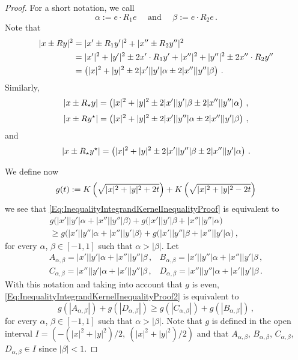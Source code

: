 \begin{proof}
    
	For a short notation, we call
	$$
	\alpha := e \cdot R_1 e  \quad \text{ and } \quad \beta := e \cdot R_2 e\,.
	$$
	Note that 
	\begin{align*}
	|x \pm Ry|^2&= |x' \pm R_1y'|^2 + |x'' \pm R_2y''|^2 \\
	&= |x'|^2 + |y'|^2 \pm 2 x'\cdot R_1 y' +  |x''|^2 + |y''|^2 \pm 2 x''\cdot R_2 y''\\
	&= \left ( { |x|^2 + |y|^2 \pm 2 |x'||y'| \alpha \pm 2 |x''||y''| \beta}\right )\,.
	\end{align*}
    Similarly,
    $$
    |x \pm R_\star y| = \left ( { |x|^2 + |y|^2 \pm 2 |x'||y'| \beta \pm 2 |x''||y''|\alpha}\right )\,,
    $$
    $$
    |x \pm R y^\star| = \left ( { |x|^2 + |y|^2 \pm 2 |x'||y''| \alpha \pm 2 |x''||y'|\beta}\right )\,,
    $$
    and
    $$
    |x \pm R_\star y^\star| = \left ( { |x|^2 + |y|^2 \pm 2 |x'||y''| \beta \pm 2 |x''||y'| \alpha}\right )\,.
    $$
	
	We define now
	$$
	g(t) := K \left ( {\sqrt{|x|^2 + |y|^2 + 2 t}}\right ) + K \left ( {\sqrt{|x|^2 + |y|^2 - 2 t}}\right )
	$$
	we see that \eqref{Eq:InequalityIntegrandKernelInequalityProof} is equivalent to
	\begin{equation}
	\label{Eq:InequalityIntegrandKernelInequalityProof2}
	\begin{split}
	g\Big(|x'||y'| \alpha + |x''||y''| \beta \Big) 
    + g\Big(|x'||y'| \beta + |x''||y''| \alpha \Big) \hspace{2cm}
	\\ \geq
	g\Big(|x'||y''| \alpha + |x''||y'|\beta \Big) 
    + g\Big(|x'||y''| \beta + |x''||y'| \alpha \Big)\,,
	\end{split}
	\end{equation}
    for every $\alpha$, $\beta \in [-1,1]$ such that $\alpha > |\beta|$. Let 
    $$
	\begin{array}{cc}
	A_{\alpha,\beta} = |x'||y'|  \alpha + |x''||y''|\beta \,, &
	B_{\alpha,\beta} = |x'||y''| \alpha + |x''||y'| \beta \,, \\
	C_{\alpha,\beta} = |x''||y'| \alpha + |x'||y''| \beta \,, &
	D_{\alpha,\beta} = |x''||y''|\alpha + |x'||y'|  \beta \,.
	\end{array}
	$$
    With this notation and taking into account that $g$ is even, \eqref{Eq:InequalityIntegrandKernelInequalityProof2} is equivalent to
	\begin{equation}
	\label{Eq:InequalityIntegrandKernelInequalityProof3}
	g(|A_{\alpha,\beta}|) + g(|D_{\alpha,\beta}|) \geq g(|C_{\alpha,\beta}|) + g(|B_{\alpha,\beta}|)\,,
	\end{equation}
    for every $\alpha$, $\beta \in [-1,1]$ such that $\alpha > |\beta|$. Note that $g$ is defined in the open interval $I = (-(|x|^2 + |y|^2)/2,\ (|x|^2 + |y|^2)/2)$ and that $A_{\alpha,\beta}$, $B_{\alpha,\beta}$, $C_{\alpha,\beta}$, $D_{\alpha,\beta} \in I$ since $|\beta| < 1$.
    

\end{proof}
